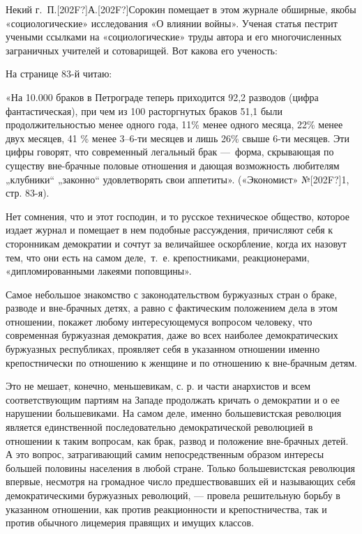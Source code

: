 \documentclass[twoside]{article}
\begin{document}
Некий г.~П.\textlatin{[202F?]}А.\textlatin{[202F?]}Сорокин помещает в этом
журнале обширные, якобы «социологические» исследования «О влиянии войны».
Ученая статья пестрит учеными ссылками на «социологические» труды автора и
его многочисленных заграничных учителей и сотоварищей. Вот какова его
ученость:

На странице 83-й читаю:

«На 10.000 браков в Петрограде теперь приходится 92,2 разводов (цифра
фантастическая), при чем из 100 расторгнутых браков 51,1 были
продолжительностью менее одного года, 11\% менее одного месяца, 22\% менее
двух месяцев, 41 \% менее 3–6-ти месяцев и лишь 26\% свыше 6-ти месяцев.
Эти цифры говорят, что современный легальный брак —~форма, скрывающая по
существу вне-брачные половые отношения и дающая возможность любителям
„клубники“ „законно“ удовлетворять свои аппетиты». («Экономист»
№\textlatin{[202F?]}1, стр. 83-я).

Нет сомнения, что и этот господин, и то русское техническое общество,
которое издает журнал и помещает в нем подобные рассуждения, причисляют
себя к сторонникам демократии и сочтут за величайшее оскорбление, когда их
назовут тем, что они есть на самом деле,~т.~е. крепостниками,
реакционерами, «дипломированными лакеями поповщины».

Самое небольшое знакомство с законодательством буржуазных стран о браке,
разводе и вне-брачных детях, а равно с фактическим положением дела в этом
отношении, покажет любому интересующемуся вопросом человеку, что
современная буржуазная демократия, даже во всех наиболее демократических
буржуазных республиках, проявляет себя в указанном отношении именно
крепостнически по отношению к женщине и по отношению к вне-брачным детям.

Это не мешает, конечно, меньшевикам, с. р. и части анархистов и всем
соответствующим партиям на Западе продолжать кричать о демократии и о ее
нарушении большевиками. На самом деле, именно большевистская революция
является единственной последовательно демократической революцией в
отношении к таким вопросам, как брак, развод и положение вне-брачных детей.
А это вопрос, затрагивающий самим непосредственным образом интересы большей
половины населения в любой стране. Только большевистская революция впервые,
несмотря на громадное число предшествовавших ей и называющих себя
демократическими буржуазных революций, — провела решительную борьбу в
указанном отношении, как против реакционности и крепостничества, так и
против обычного лицемерия правящих и имущих классов.
\end{document}
